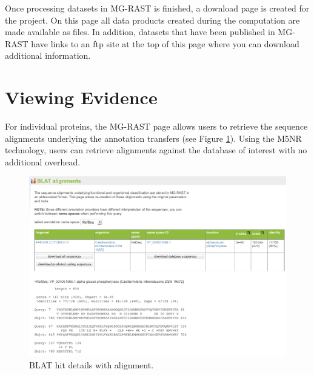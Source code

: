 \documentclass[12pt,fullpage]{report}
\begin{document}
Once processing datasets in MG-RAST is finished, a download page is created for the project. On this page all data products created during the computation are made available as files. In addition, datasets that have been published in MG-RAST have links to an ftp site at the top of this page where you can download additional information.




\section{Viewing Evidence}

For individual proteins, the MG-RAST page allows users to retrieve the sequence alignments underlying the annotation transfers (see Figure \ref{fig:blat-alignment}).
Using the M5NR \cite{M5NR} technology, users can retrieve alignments against the database of interest with no additional overhead.

\begin{figure}[ht]
\begin{center}
\includegraphics[width=6in]{Images/blat-alignment.png}
\end{center}
\caption{
BLAT hit details with alignment.
}
\label{fig:blat-alignment}
\end{figure}
\end{document}
